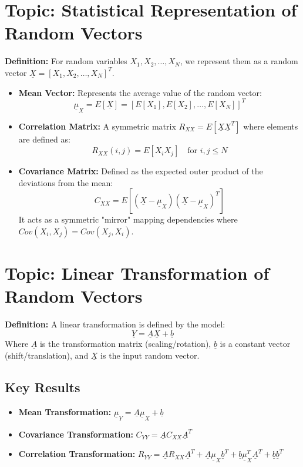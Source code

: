 \documentclass{article}
\renewcommand{\vec}[1]{\underline{#1}}
\begin{document}
\section*{Topic: Statistical Representation of Random Vectors}

\textbf{Definition:} For random variables $X_{1}, X_{2}, \dots, X_{N}$, we represent them as a random vector $\vec{X} = [X_1, X_2, \dots, X_N]^T$. 

\begin{itemize}
    \item \textbf{Mean Vector:} Represents the average value of the random vector:
    \[ \vec{\mu}_{X} = E[\vec{X}] = [E[X_1], E[X_2], \dots, E[X_N]]^T \]
    
    \item \textbf{Correlation Matrix:} A symmetric matrix $R_{XX} = E[\vec{X}\vec{X}^{T}]$ where elements are defined as:
    \[ R_{XX}(i,j) = E[X_{i}X_{j}] \quad \text{for } i, j \le N \]
    
    \item \textbf{Covariance Matrix:} Defined as the expected outer product of the deviations from the mean:
    \[ C_{XX} = E[(\vec{X}-\vec{\mu}_{X})(\vec{X}-\vec{\mu}_{X})^{T}] \]
    It acts as a symmetric "mirror" mapping dependencies where $Cov(X_{i},X_{j}) = Cov(X_{j},X_{i})$.
\end{itemize}

\hr
\section*{Topic: Linear Transformation of Random Vectors}

\textbf{Definition:} A linear transformation is defined by the model:
\[ \vec{Y} = \vec{A}\vec{X} + \vec{b} \]
Where $\vec{A}$ is the transformation matrix (scaling/rotation), $\vec{b}$ is a constant vector (shift/translation), and $\vec{X}$ is the input random vector.

\subsection*{Key Results}
\begin{itemize}
    \item \textbf{Mean Transformation:} $\vec{\mu}_{Y} = \vec{A}\vec{\mu}_{X} + \vec{b}$
    \item \textbf{Covariance Transformation:} $C_{YY} = \vec{A}C_{XX}\vec{A}^{T}$
    \item \textbf{Correlation Transformation:} $R_{YY} = \vec{A}R_{XX}\vec{A}^{T} + \vec{A}\vec{\mu}_{X}\vec{b}^{T} + \vec{b}\vec{\mu}_{X}^{T}\vec{A}^{T} + \vec{b}\vec{b}^{T}$
\end{itemize}
\end{document}

